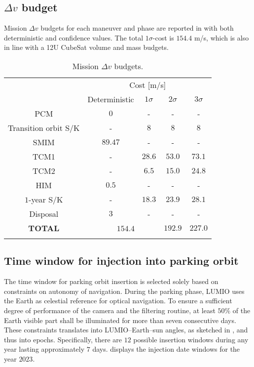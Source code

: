\subsection{$\Delta v$ budget}
\label{subsec:deltavbudget}
Mission $\Delta v$ budgets for each maneuver and phase are reported in  with both deterministic and confidence values. The total $1\sigma$-cost is $154.4$ m/s, which is also in line with a 12U CubeSat volume and mass  budgets.
%
\begin{table}[!h]
	\caption{Mission $\Delta v$ budgets.}
	\label{tab:MissiondvBudgets}
	\centering
	\footnotesize
	\begin{tabular}{ccc|cc}
		\TOPlines
		\multirow{2}{*}{Maneuver} & \multicolumn{4}{c}{Cost [m/s]} \\
		& Deterministic & $1\sigma$ & $2\sigma$ & $3\sigma$ \\
		\MIDline
		PCM               & $0$  & - & - & - \\
		Transition orbit S/K & - & $8$ & $8$ & $8$ \\
		SMIM              & $89.47$ & - & - & - \\
		TCM1              & - & $28.6$ & $53.0$ & $73.1$ \\
		TCM2              & - & $6.5$ & $15.0$ & $24.8$ \\
		HIM               & $0.5$ & - & - & - \\
		$1$-year S/K & - & $18.3$ & $23.9$ & $28.1$ \\
		Disposal          & $3$ & - & - & - \\
		\MIDline
		\textbf{TOTAL} & \multicolumn{2}{c}{\ \ $154.4$} & $192.9$ & $227.0$ \\
		\BOTTOMlines
	\end{tabular}
\end{table}
%

\subsection{Time window for injection into parking orbit}\label{subsec:Time window for injection into parking orbit}
The time window for parking orbit insertion is selected solely based on constraints on autonomy of navigation. During the parking phase, LUMIO uses the Earth as celestial reference for optical navigation. To ensure a sufficient degree of performance of the camera and the filtering routine, at least $50\%$ of the Earth visible part shall be illuminated for more than seven consecutive days. These constraints translates into LUMIO--Earth--sun angles, as sketched in , and thus into epochs. Specifically, there are $12$ possible insertion windows during any year lasting approximately $7$ days.  displays the injection date windows for the year $2023$.

